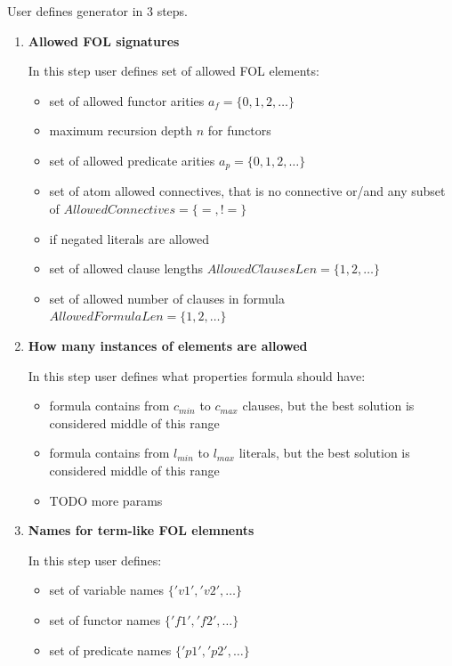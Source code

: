 User defines generator in 3 steps.
\begin{enumerate}
  \item \textbf{Allowed FOL signatures}

    In this step user defines set of allowed \gls{FOL} elements:
    \begin{itemize}
      \item set of allowed functor arities $a_f = \{0, 1, 2,\dots\}$
      \item maximum recursion depth $n$ for functors
      \item set of allowed predicate arities $a_p = \{0, 1, 2,\dots\}$
      \item set of atom allowed connectives, that is no connective or/and any subset of $AllowedConnectives = \{=, !=\}$
      \item if negated literals are allowed
      \item set of allowed clause lengths $AllowedClausesLen = \{1,2,\dots\}$
      \item set of allowed number of clauses in formula $AllowedFormulaLen = \{1,2,\dots\}$
    \end{itemize}
  \item \textbf{How many instances of elements are allowed}

    In this step user defines what properties formula should have:
    \begin{itemize}
      \item formula contains from $c_{min}$ to $c_{max}$ clauses, but the best solution is considered middle of this range
      \item formula contains from $l_{min}$ to $l_{max}$ literals, but the best solution is considered middle of this range
      \item TODO more params
    \end{itemize}
  \item \textbf{Names for term-like FOL elemnents}

    In this step user defines:
    \begin{itemize}
      \item set of variable names $\{'v1','v2',\dots\}$
      \item set of functor names $\{'f1','f2',\dots\}$
      \item set of predicate names $\{'p1','p2',\dots\}$
    \end{itemize}
\end{enumerate}
